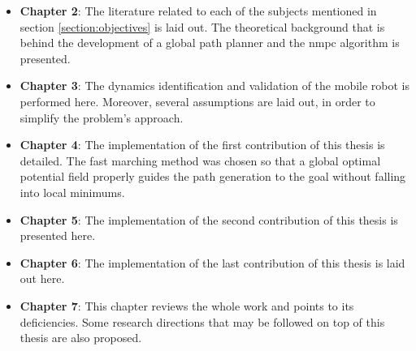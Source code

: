 \begin{itemize}
\item \textbf{Chapter 2}: The literature related to each of the subjects mentioned in section \ref{section:objectives} is laid out. The theoretical background that is behind the development of a global path planner and the \acrshort{nmpc} algorithm is presented.
\item \textbf{Chapter 3}: The dynamics identification and validation of the mobile robot is performed here. Moreover, several assumptions are laid out, in order to simplify the problem's approach.
\item \textbf{Chapter 4}: The implementation of the first contribution of this thesis is detailed. The fast marching method was chosen so that a global optimal potential field properly guides the path generation to the goal without falling into local minimums.
\item \textbf{Chapter 5}: The implementation of the second contribution of this thesis is presented here.
\item \textbf{Chapter 6}: The implementation of the last contribution of this thesis is laid out here.
\item \textbf{Chapter 7}: This chapter reviews the whole work and points to its deficiencies. Some research directions that may be followed on top of this thesis are also proposed.
\end{itemize}